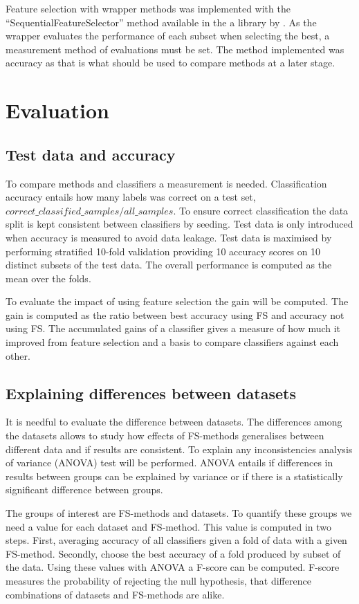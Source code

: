 Feature selection with wrapper methods was implemented with the ``SequentialFeatureSelector'' method available in the a library by \textcite{mlextend}. As the wrapper evaluates the performance of each subset when selecting the best, a measurement method of evaluations must be set. The method implemented was accuracy as that is what should be used to compare methods at a later stage.


\section{Evaluation}
\label{Evaluation}

\subsection{Test data and accuracy}

To compare methods and classifiers a measurement is needed. Classification accuracy entails how many labels was correct on a test set, $correct\_classified\_samples/all\_samples$. To ensure correct classification the data split is kept consistent between classifiers by seeding. Test data is only introduced when accuracy is measured to avoid data leakage. Test data is maximised by performing stratified 10-fold validation providing 10 accuracy scores on 10 distinct subsets of the test data. The overall performance is computed as the mean over the folds.

To evaluate the impact of using feature selection the gain will be computed. The gain is computed as the ratio between best accuracy using FS and accuracy not using FS. The accumulated gains of a classifier gives a measure of how much it improved from feature selection and a basis to compare classifiers against each other.

\subsection{Explaining differences between datasets}

It is needful to evaluate the difference between datasets. The differences among the datasets allows to study how effects of FS-methods generalises between different data and if results are consistent. To explain any inconsistencies analysis of variance (ANOVA) test will be performed. ANOVA entails if differences in results between groups can be explained by variance or if there is a statistically significant difference between groups.

The groups of interest are FS-methods and datasets. To quantify these groups we need a value for each dataset and FS-method. This value is computed in two steps. First, averaging accuracy of all classifiers given a fold of data with a given FS-method. Secondly, choose the best accuracy of a fold produced by subset of the data. Using these values with ANOVA a F-score can be computed. F-score measures the probability of rejecting the null hypothesis, that difference combinations of datasets and FS-methods are alike.

